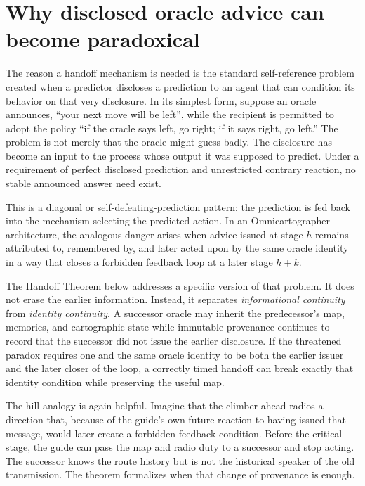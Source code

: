 \documentclass[11pt]{article}
\theoremstyle{remark}
\begin{document}
\section{Why disclosed oracle advice can become paradoxical}

The reason a handoff mechanism is needed is the standard self-reference problem created when a predictor discloses a prediction to an agent that can condition its behavior on that very disclosure. In its simplest form, suppose an oracle announces, ``your next move will be left'', while the recipient is permitted to adopt the policy ``if the oracle says left, go right; if it says right, go left.'' The problem is not merely that the oracle might guess badly. The disclosure has become an input to the process whose output it was supposed to predict. Under a requirement of perfect disclosed prediction and unrestricted contrary reaction, no stable announced answer need exist.

This is a diagonal or self-defeating-prediction pattern: the prediction is fed back into the mechanism selecting the predicted action. In an Omnicartographer architecture, the analogous danger arises when advice issued at stage $h$ remains attributed to, remembered by, and later acted upon by the same oracle identity in a way that closes a forbidden feedback loop at a later stage $h+k$.

The Handoff Theorem below addresses a specific version of that problem. It does not erase the earlier information. Instead, it separates \emph{informational continuity} from \emph{identity continuity}. A successor oracle may inherit the predecessor's map, memories, and cartographic state while immutable provenance continues to record that the successor did not issue the earlier disclosure. If the threatened paradox requires one and the same oracle identity to be both the earlier issuer and the later closer of the loop, a correctly timed handoff can break exactly that identity condition while preserving the useful map.

The hill analogy is again helpful. Imagine that the climber ahead radios a direction that, because of the guide's own future reaction to having issued that message, would later create a forbidden feedback condition. Before the critical stage, the guide can pass the map and radio duty to a successor and stop acting. The successor knows the route history but is not the historical speaker of the old transmission. The theorem formalizes when that change of provenance is enough.
\end{document}
